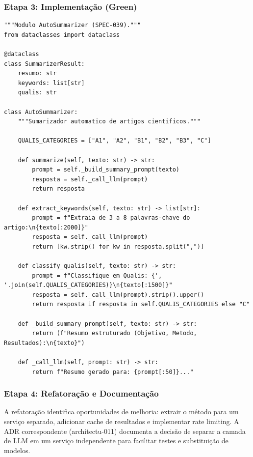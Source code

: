 \subsubsection{Etapa 3: Implementação (Green)}

\begin{lstlisting}[style=pythonstyle, caption={Implementacao do AutoSummarizer},
                   label={lst:spec-impl}]
"""Modulo AutoSummarizer (SPEC-039)."""
from dataclasses import dataclass

@dataclass
class SummarizerResult:
    resumo: str
    keywords: list[str]
    qualis: str

class AutoSummarizer:
    """Sumarizador automatico de artigos cientificos."""

    QUALIS_CATEGORIES = ["A1", "A2", "B1", "B2", "B3", "C"]

    def summarize(self, texto: str) -> str:
        prompt = self._build_summary_prompt(texto)
        resposta = self._call_llm(prompt)
        return resposta

    def extract_keywords(self, texto: str) -> list[str]:
        prompt = f"Extraia de 3 a 8 palavras-chave do artigo:\n{texto[:2000]}"
        resposta = self._call_llm(prompt)
        return [kw.strip() for kw in resposta.split(",")]

    def classify_qualis(self, texto: str) -> str:
        prompt = f"Classifique em Qualis: {', '.join(self.QUALIS_CATEGORIES)}\n{texto[:1500]}"
        resposta = self._call_llm(prompt).strip().upper()
        return resposta if resposta in self.QUALIS_CATEGORIES else "C"

    def _build_summary_prompt(self, texto: str) -> str:
        return (f"Resumo estruturado (Objetivo, Metodo, Resultados):\n{texto}")

    def _call_llm(self, prompt: str) -> str:
        return f"Resumo gerado para: {prompt[:50]}..."
\end{lstlisting}

\subsubsection{Etapa 4: Refatoração e Documentação}

A refatoração identifica oportunidades de melhoria: extrair o método
 para um serviço separado, adicionar cache de
resultados e implementar rate limiting. A ADR correspondente
(architectu-011) documenta a decisão de separar a camada de LLM em um
serviço independente para facilitar testes e substituição de modelos.

